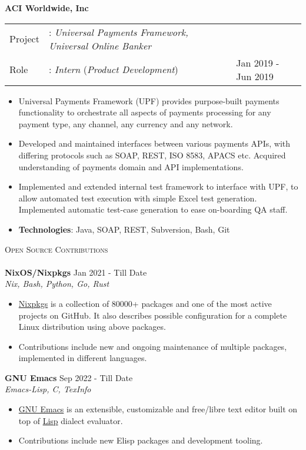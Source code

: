 \documentclass[a4paper]{article}
\newcommand{\lineunder} {
    \vspace*{-8pt} \\
    \hspace*{-18pt} \hrulefill \\
}
\newcommand{\header} [1] {
    {\hspace*{-18pt}\vspace*{6pt} \textsc{#1}}
    \vspace*{-6pt} \lineunder
}
\begin{document}
\textbf{ACI Worldwide, Inc} \\
\begin{tabularx}{\textwidth}{ l l>{\raggedleft\arraybackslash}X}
  Project & : \textit{Universal Payments Framework, Universal Online Banker } & \\
  Role & : \textit{Intern} (\textit{Product Development}) & Jan 2019 - Jun 2019\\
\end{tabularx}
\begin{itemize} \itemsep 1pt
  \item Universal Payments Framework (UPF) provides purpose-built payments functionality to orchestrate all aspects of payments processing for any payment type, any channel, any currency and any network.
  \item Developed and maintained interfaces between various payments APIs, with differing protocols such as SOAP, REST, ISO 8583, APACS etc. Acquired understanding of payments domain and API implementations.
  \item Implemented and extended internal test framework to interface with UPF, to allow automated test execution with simple Excel test generation. Implemented automatic test-case generation to ease on-boarding QA staff.
  \item \textbf{Technologies}: Java, SOAP, REST, Subversion, Bash, Git
\end{itemize}
\vspace{1mm}

\header{Open Source Contributions}
\vspace{1mm}
{\textbf{NixOS/Nixpkgs}} \hfill Jan 2021 - Till Date \\
\textit{Nix, Bash, Python, Go, Rust} \\
\begin{itemize}
  \item \href{https://github.com/NixOS/nixpkgs/}{Nixpkgs} is a collection of 80000+ packages and one of the most active projects on GitHub. It also describes possible configuration for a complete Linux distribution using above packages.
  \item Contributions include new and ongoing maintenance of multiple packages, implemented in different languages.
\end{itemize}

{\textbf{GNU Emacs}} \hfill Sep 2022 - Till Date \\
\textit{Emacs-Lisp, C, TexInfo} \\
\begin{itemize}
  \item \href{https://www.gnu.org/software/emacs/}{GNU Emacs} is an extensible, customizable and free/libre text editor built on top of \href{https://en.wikipedia.org/wiki/Lisp_(programming_language)}{Lisp} dialect evaluator. \\
  \item Contributions include new Elisp packages and development tooling.\\
\end{itemize}
\end{document}
